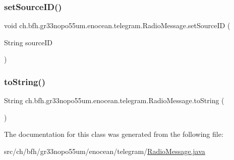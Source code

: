 \hypertarget{classch_1_1bfh_1_1gr33nopo55um_1_1enocean_1_1telegram_1_1_radio_message_a9f14973ca97eecf23d30f8e63d4ae83f}{}\label{classch_1_1bfh_1_1gr33nopo55um_1_1enocean_1_1telegram_1_1_radio_message_a9f14973ca97eecf23d30f8e63d4ae83f} 
\subsubsection{\texorpdfstring{set\+Source\+I\+D()}{setSourceID()}}
{\footnotesize\ttfamily void ch.\+bfh.\+gr33nopo55um.\+enocean.\+telegram.\+Radio\+Message.\+set\+Source\+ID (\begin{DoxyParamCaption}\item[{String}]{source\+ID }\end{DoxyParamCaption})}

\hypertarget{classch_1_1bfh_1_1gr33nopo55um_1_1enocean_1_1telegram_1_1_radio_message_af8e045ec1e5c0abe833d31b807977fed}{}\label{classch_1_1bfh_1_1gr33nopo55um_1_1enocean_1_1telegram_1_1_radio_message_af8e045ec1e5c0abe833d31b807977fed} 
\subsubsection{\texorpdfstring{to\+String()}{toString()}}
{\footnotesize\ttfamily String ch.\+bfh.\+gr33nopo55um.\+enocean.\+telegram.\+Radio\+Message.\+to\+String (\begin{DoxyParamCaption}{ }\end{DoxyParamCaption})}



The documentation for this class was generated from the following file\+:\begin{DoxyCompactItemize}
\item 
src/ch/bfh/gr33nopo55um/enocean/telegram/\hyperlink{ch_2bfh_2gr33nopo55um_2enocean_2telegram_2_radio_message_8java}{Radio\+Message.\+java}\end{DoxyCompactItemize}
